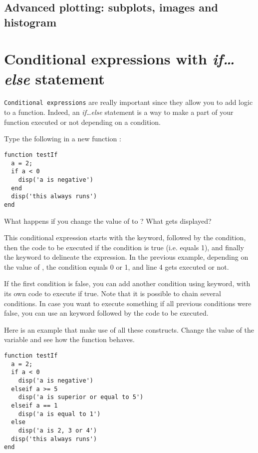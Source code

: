 \documentclass{article}
\begin{document}
\subsection*{Advanced plotting: subplots, images and histogram}




\section{Conditional expressions with \emph{if\dots else} statement}

\verb|Conditional expressions| are really important since they allow you to add logic to a function.
Indeed, an \emph{if\dots else} statement is a way to make a part of your function executed or not depending on a condition.

Type the following in a new function :
\begin{lstlisting}
function testIf
  a = 2;
  if a < 0
    disp('a is negative')
  end
  disp('this always runs')
end
\end{lstlisting}
What happens if you change the value of  to ?
What gets displayed?

This conditional expression starts with the  keyword, followed by the condition, then the code to be executed if the condition is true (i.e. equals 1), and finally the  keyword to delineate the expression.
In the previous example, depending on the value of , the condition  equals 0 or 1, and line 4 gets executed or not.

If the first condition is false, you can add another condition using  keyword, with its own code to execute if true.
Note that it is possible to chain several  conditions.
In case you want to execute something if all previous conditions were false, you can use an  keyword followed by the code to be executed.

Here is an example that make use of all these constructs.
Change the value of the variable  and see how the function behaves.
\begin{lstlisting}
function testIf
  a = 2;
  if a < 0
    disp('a is negative')
  elseif a >= 5
    disp('a is superior or equal to 5')
  elseif a == 1
    disp('a is equal to 1')
  else
    disp('a is 2, 3 or 4')
  disp('this always runs')
end
\end{lstlisting}
\end{document}

